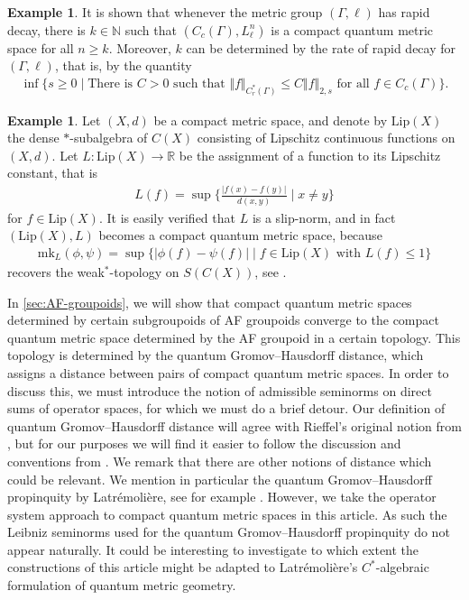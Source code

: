 \documentclass[11pt,a4paper,oneside,final,reqno]{amsart}
\theoremstyle{definition}
\newtheorem{example}[lemma]{Example}
\newcommand{\mk}{\mathrm{mk}}
\newcommand{\Cred}{C_{r}^{*}}
\newcommand{\R}{\mathbb{R}}
\newcommand{\N}{\mathbb{N}}
\numberwithin{equation}{section}
\begin{document}
\begin{example}
		It is shown that whenever the metric group $(\Gamma, \ell)$ has rapid decay, there is $k \in \N$ such that $(C_c (\Gamma), L^n_\ell)$ is a compact quantum metric space for all $n \geq k$. Moreover, $k$ can be determined by the rate of rapid decay for $(\Gamma, \ell)$, that is, by the quantity
		\begin{align*}
			\inf \{ s\geq 0\mid \text{There is $C > 0$ such that $\Vert f \Vert_{\Cred(\Gamma)} \leq C \Vert f \Vert_{2,s}$ for all $f \in C_c(\Gamma)$}\}.
		\end{align*}
	\end{example}
	
	\begin{example}\label{example:CQMS-from-compact-metric-spaces}
		Let $(X,d)$ be a compact metric space, and denote by $\mathrm{Lip}(X)$ the dense $*$-subalgebra of $C(X)$ consisting of Lipschitz continuous functions on $(X,d)$. Let $L \colon \mathrm{Lip}(X) \to \R$ be the assignment of a function to its Lipschitz constant, that is
		\begin{align*}
			L(f) = \sup \{ \frac{\vert f(x) - f(y) \vert}{d(x,y)} \mid x \neq y  \}
		\end{align*}
		for $f \in \mathrm{Lip }(X)$. It is easily verified that $L$ is a slip-norm, and in fact $(\mathrm{Lip}(X), L)$ becomes a compact quantum metric space, because 
		\begin{align*}
			\mk_L (\phi, \psi) = \sup \{ \vert \phi(f) - \psi(f) \vert \mid f\in \mathrm{Lip}(X) \text{ with } L(f) \leq 1  \}
		\end{align*}
		recovers the weak$^*$-topology on $S(C(X))$, see \cite{RieffelMetricsOnStateSpaces1999}. 
	\end{example}
	
	In \cref{sec:AF-groupoids}, we will show that compact quantum metric spaces determined by certain subgroupoids of AF groupoids converge to the compact quantum metric space determined by the AF groupoid in a certain topology. This topology is determined by the quantum Gromov--Hausdorff distance, which assigns a distance between pairs of compact quantum metric spaces. In order to discuss this, we must introduce the notion of admissible seminorms on direct sums of operator spaces, for which we must do a brief detour. Our definition of quantum Gromov--Hausdorff distance will agree with Rieffel's original notion from \cite{Rieffel2004qGH}, but for our purposes we will find it easier to follow the discussion and conventions from \cite{KaadKyedSU2}. We remark that there are other notions of distance which could be relevant. 
	We mention in particular the quantum Gromov--Hausdorff propinquity by Latrémolière, see for example 
	\cite{LatremoliereDual15, LatremoliereqGHP16}. However, we take the operator system approach to compact quantum metric spaces in this article. As such the Leibniz seminorms used for the quantum Gromov--Hausdorff propinquity do not appear naturally. It could be interesting to investigate 
	to which extent
	the constructions of this article 
	might be adapted to Latrémolière's $C^*$-algebraic formulation of quantum metric geometry. 
\end{document}
